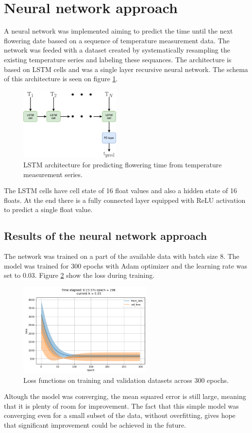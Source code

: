 \documentclass[11pt, a4paper]{article}
\begin{document}
\newpage
\section*{Neural network approach}
A neural network was implemented aiming to predict the time until the next flowering date bassed on a sequence of temperature
measurement data. The network was feeded with a dataset created by systematically resampling the existing temperature series and 
labeling these sequances. The architecture is based on LSTM cells and was a single layer recursive neural network. 
The schema of this architecture is seen on figure \ref{fig:LSTM_arch}.
\begin{figure}[H]
    \centering
    \includegraphics[width=0.45\textwidth]{images/LSTM_arch.png}
    \caption{LSTM architecture for predicting flowering time from temperature measurement series.}
    \label{fig:LSTM_arch}
\end{figure}
The LSTM cells have cell state of 16 float values and also a hidden state of 16 floats. At the end there is a fully connected 
layer equipped with ReLU activation to predict a single float value.
\subsection*{Results of the neural network approach}
The network was trained on a part of the available data with batch size 8. The model was trained for 300 epochs with
Adam optimizer and the learning rate was set to 0.03. Figure \ref{fig:loss-6} show the loss during training.
\begin{figure}[H]
    \centering
    \includegraphics[width=0.6\textwidth]{images/loss-6.png}
    \caption{Loss functions on training and validation datasets across 300 epochs.}
    \label{fig:loss-6}
\end{figure}
Altough the model was converging, the mean squared error is still large, meaning that it is plenty of room for improvement.
The fact that this simple model was converging even for a small subset of the data, without overfitting, gives hope that
significant improvement could be achieved in the future.
\end{document}
